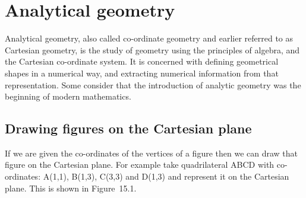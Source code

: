          \chapter{Analytical geometry}
    \setcounter{figure}{1}
    \setcounter{subfigure}{1}
    \label{71522cd1c95e0cbedb9f300409036b1b}
    
    
    
    
       
%     
%     
%     
%     
    
    
%   
%             
        
        \label{m39107*id66769}Analytical geometry, also called co-ordinate geometry and earlier referred to as Cartesian geometry, is the study of geometry using the principles of algebra, and the Cartesian co-ordinate system. It is concerned with defining geometrical shapes in a numerical way, and extracting numerical information from that representation. Some consider that the introduction of analytic geometry was the beginning of modern mathematics.\par 
      
      \label{m39107*eip-448}
            \section{ Drawing figures on the Cartesian plane}
            \nopagebreak
            \label{m39107*eip-728}If we are given the co-ordinates of the vertices of a figure then we can draw that figure on the Cartesian plane. For example take quadrilateral ABCD with co-ordinates: A(1,1), B(1,3), C(3,3) and D(1,3) and represent it on the Cartesian plane. This is shown in Figure~15.1.   
\par \label{m39107*eip-199}
    \setcounter{subfigure}{0}


